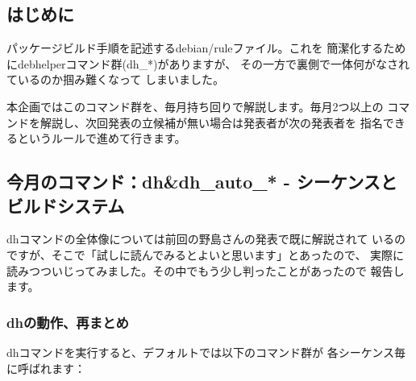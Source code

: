 \documentclass[mingoth,a4paper]{jsarticle}
\begin{document}
\subsection{はじめに}
パッケージビルド手順を記述するdebian/ruleファイル。これを
簡潔化するためにdebhelperコマンド群(dh\_*)がありますが、
その一方で裏側で一体何がなされているのか掴み難くなって
しまいました。

本企画ではこのコマンド群を、毎月持ち回りで解説します。毎月2つ以上の
コマンドを解説し、次回発表の立候補が無い場合は発表者が次の発表者を
指名できるというルールで進めて行きます。

\subsection{今月のコマンド：dh\&dh\_auto\_* - シーケンスとビルドシステム}

dhコマンドの全体像については前回の野島さんの発表で既に解説されて
いるのですが、そこで「試しに読んでみるとよいと思います」とあったので、
実際に読みつついじってみました。その中でもう少し判ったことがあったので
報告します。

\subsubsection{dhの動作、再まとめ}

dhコマンドを実行すると、デフォルトでは以下のコマンド群が
各シーケンス毎に呼ばれます：
\end{document}
